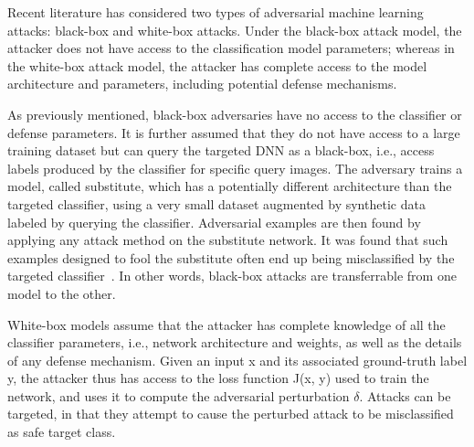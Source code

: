Recent literature has considered two types of adversarial machine learning attacks: black-box and white-box attacks. Under the black-box attack model, the attacker does not have access to the classification model parameters; whereas in the white-box attack model, the attacker has complete access to the model architecture and parameters, including potential defense mechanisms.




As previously mentioned, black-box adversaries have no access to the classifier
or defense parameters. It is further assumed that they do not have access to a large training dataset
but can query the targeted DNN as a black-box, i.e., access labels produced by the classifier for
specific query images. The adversary trains a model, called substitute, which has a potentially
different architecture than the targeted classifier, using a very small dataset augmented by synthetic
data labeled by querying the classifier. Adversarial examples are then found by applying any
attack method on the substitute network. It was found that such examples designed to fool the substitute often end up being misclassified by the targeted classifier~\cite{szegedy2014going, papernot2017practical}. In other words, black-box attacks are  transferrable from one model to the other. 

White-box models assume that the attacker has complete knowledge of all the classifier parameters, i.e., network architecture and weights, as well as the details of any defense mechanism. Given an input x and its associated ground-truth label y, the attacker thus has access to the loss function J(x, y) used to train the network, and uses it to compute the adversarial perturbation $\delta$. Attacks can be targeted, in that they attempt to cause the perturbed attack to be misclassified as safe target class. 






